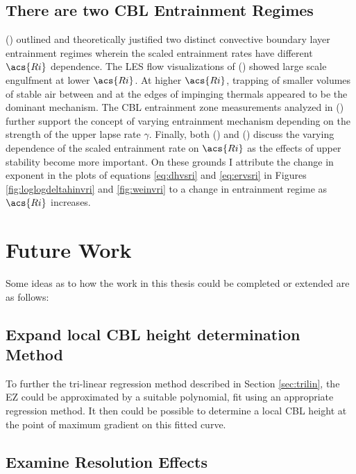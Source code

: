 \subsection{There are two \acs{CBL} Entrainment Regimes}

\citeauthor{Turner86} (\citeyear{Turner86}) outlined and theoretically justified two distinct convective boundary layer entrainment regimes wherein the scaled entrainment rates have different $\acs{Ri}$ dependence. The \acs{LES} flow visualizations of \citeauthor{SullMoengStev} (\citeyear{SullMoengStev}) showed large scale engulfment at lower $\acs{Ri}$.  At higher $\acs{Ri}$, trapping of smaller volumes of stable air between and at the edges of impinging thermals appeared to be the dominant mechanism. The \acs{CBL} entrainment zone measurements analyzed in \citeauthor{Traum11} (\citeyear{Traum11}) further support the concept of varying entrainment mechanism depending on the strength of the upper lapse rate $\gamma$.  Finally, both \citeauthor{FedConzMir04} (\citeyear{FedConzMir04})  and \citeauthor{GarciaMellado} (\citeyear{GarciaMellado}) discuss the varying dependence of the scaled entrainment rate on $\acs{Ri}$ as the effects of upper stability become more important.  On these grounds I attribute the change in exponent in the plots of equations \ref{eq:dhvsri} and \ref{eq:ervsri} in Figures \ref{fig:loglogdeltahinvri} and \ref{fig:weinvri} to a change in entrainment regime as $\acs{Ri}$ increases.   


\section{Future Work}

Some ideas as to how the work in this thesis could be completed or extended are as follows:

\subsection{Expand local \acs{CBL} height determination Method}

To further the tri-linear regression method described in Section \ref{sec:trilin}, the \acs{EZ} could be approximated by a suitable polynomial, fit using an appropriate regression method.  It then could be possible to determine a local \acs{CBL} height at the point of maximum gradient on this fitted curve.\\

\subsection{Examine Resolution Effects}

